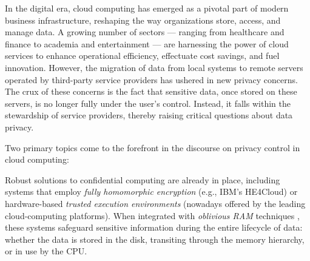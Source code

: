 \documentclass[sigconf]{acmart}
\def\vgap{\vspace{0mm}}
\begin{document}
In the digital era, cloud computing has emerged as a pivotal part of modern business infrastructure, reshaping the way organizations store, access, and manage data. A growing number of sectors --- ranging from healthcare and finance to academia and entertainment --- are harnessing the power of cloud services to enhance operational efficiency, effectuate cost savings, and fuel innovation. However, the migration of data from local systems to remote servers operated by third-party service providers has ushered in new privacy concerns. The crux of these concerns is the fact that sensitive data, once stored on these servers, is no longer fully under the user's control. Instead, it falls within the stewardship of service providers, thereby raising critical questions about data privacy.

\vgap

Two primary topics come to the forefront in the discourse on privacy control in cloud computing:

Robust solutions to confidential computing are already in place, including systems that employ {\em fully homomorphic encryption} (e.g., IBM's HE4Cloud) or hardware-based {\em trusted execution environments} (nowadays offered by the leading cloud-computing platforms). When integrated with {\em oblivious RAM} techniques \cite{akl+23,go96,ln18,ppry18}, these systems safeguard sensitive information during the entire lifecycle of data: whether the data is stored in the disk, transiting through the memory hierarchy, or in use by the CPU.

\vgap
\end{document}
